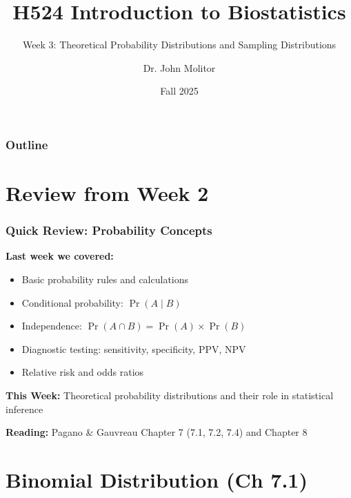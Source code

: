 \documentclass{beamer}
\title{H524 Introduction to Biostatistics}
\subtitle{Week 3: Theoretical Probability Distributions and Sampling Distributions}
\author{Dr. John Molitor}
\institute{}
\date{Fall 2025}
\begin{document}
\frame{\titlepage}

\begin{frame}
\frametitle{Outline}
\tableofcontents
\end{frame}

\section{Review from Week 2}

\begin{frame}
\frametitle{Quick Review: Probability Concepts}
\textbf{Last week we covered:}
\begin{itemize}
\item Basic probability rules and calculations
\item Conditional probability: $\Pr(A \mid B)$
\item Independence: $\Pr(A \cap B) = \Pr(A) \times \Pr(B)$
\item Diagnostic testing: sensitivity, specificity, PPV, NPV
\item Relative risk and odds ratios
\end{itemize}

\vspace{0.5cm}
\textbf{This Week:} Theoretical probability distributions and their role in statistical inference

\vspace{0.3cm}
\textbf{Reading:} Pagano \& Gauvreau Chapter 7 (7.1, 7.2, 7.4) and Chapter 8
\end{frame}

\section{Binomial Distribution (Ch 7.1)}
\end{document}
